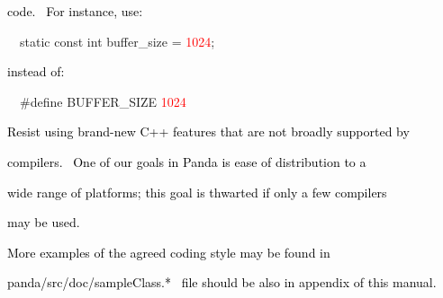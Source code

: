 \documentclass[a4paper]{article}
\newcommand\textstyleOOoComputerKeyWord[1]{\textrm{\textcolor[rgb]{0.0,0.0,0.5019608}{#1}}}
\newcommand\textstyleOOoComputerIdent[1]{\textrm{\textcolor[rgb]{0.0,0.5019608,0.0}{#1}}}
\newcommand\textstyleOOoComputerLiteral[1]{\textrm{\textcolor{red}{#1}}}
\begin{document}
{\color{black}
\textstyleOOoComputerKeyWord{\textcolor{black}{code. \ For instance, use:}}}

\clearpage
\bigskip


\bigskip

{\color{black}
\textstyleOOoComputerKeyWord{\textcolor{black}{\ \ }}\textstyleOOoComputerKeyWord{static}\textstyleOOoComputerKeyWord{\textcolor{black}{
}}\textstyleOOoComputerKeyWord{const}\textstyleOOoComputerKeyWord{\textcolor{black}{
}}\textstyleOOoComputerKeyWord{int}\textstyleOOoComputerKeyWord{\textcolor{black}{
}}\textstyleOOoComputerIdent{buffer\_size}\textstyleOOoComputerKeyWord{\textcolor{black}{
}}\textstyleOOoComputerKeyWord{=}\textstyleOOoComputerKeyWord{\textcolor{black}{
}}\textstyleOOoComputerLiteral{1024}\textstyleOOoComputerKeyWord{;}}


\bigskip

{\color{black}
\textstyleOOoComputerKeyWord{\textcolor{black}{instead of:}}}


\bigskip

{\color{black}
\textstyleOOoComputerKeyWord{\textcolor{black}{\ \ }}\textstyleOOoComputerKeyWord{\#define}\textstyleOOoComputerKeyWord{\textcolor{black}{
}}\textstyleOOoComputerIdent{BUFFER\_SIZE}\textstyleOOoComputerKeyWord{\textcolor{black}{
}}\textstyleOOoComputerLiteral{1024}}


\bigskip


\bigskip

{\color{black}
\textstyleOOoComputerKeyWord{\textcolor{black}{Resist using brand-new C++ features that are not broadly supported by}}}

{\color{black}
\textstyleOOoComputerKeyWord{\textcolor{black}{compilers. \ One of our goals in Panda is ease of distribution to a}}}

{\color{black}
\textstyleOOoComputerKeyWord{\textcolor{black}{wide range of platforms; this goal is thwarted if only a few compilers}}}

{\color{black}
\textstyleOOoComputerKeyWord{\textcolor{black}{may be used.}}}


\bigskip


\bigskip

{\color{black}
\textstyleOOoComputerKeyWord{\textcolor{black}{More examples of the agreed coding style may be found in}}}

{\color{black}
\textstyleOOoComputerKeyWord{\textcolor{black}{panda/src/doc/sampleClass.*
\ }}\textstyleOOoComputerKeyWord{\textcolor{black}{file should be also in appendix of this
manual}}\textstyleOOoComputerKeyWord{\textcolor{black}{.}}}
\end{document}
